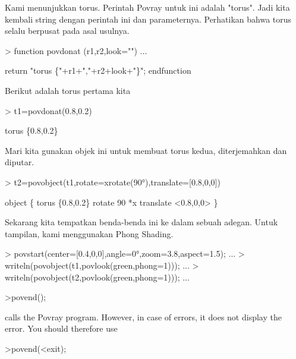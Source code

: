 \documentclass{report}
\begin{document}
\begin{eulernotebook}
\begin{eulercomment}
\begin{eulercomment}
\begin{eulercomment}
Kami menunjukkan torus. Perintah Povray untuk ini adalah "torus". Jadi
kita kembali string dengan perintah ini dan parameternya. Perhatikan
bahwa torus selalu berpusat pada asal usulnya.
\end{eulercomment}
\begin{eulerprompt}
> function povdonat (r1,r2,look="") ...
\end{eulerprompt}
\begin{eulerudf}
    return "torus \{"+r1+","+r2+look+"\}";
  endfunction
\end{eulerudf}
\begin{eulercomment}
Berikut adalah torus pertama kita
\end{eulercomment}
\begin{eulerprompt}
> t1=povdonat(0.8,0.2)
\end{eulerprompt}
\begin{euleroutput}
  torus \{0.8,0.2\}
\end{euleroutput}
\begin{eulercomment}
Mari kita gunakan objek ini untuk membuat torus kedua, diterjemahkan
dan diputar.
\end{eulercomment}
\begin{eulerprompt}
> t2=povobject(t1,rotate=xrotate(90°),translate=[0.8,0,0])
\end{eulerprompt}
\begin{euleroutput}
  object \{ torus \{0.8,0.2\}
   rotate 90 *x 
   translate <0.8,0,0>
   \}
\end{euleroutput}
\begin{eulercomment}
Sekarang kita tempatkan benda-benda ini ke dalam sebuah adegan. Untuk
tampilan, kami menggunakan Phong Shading.
\end{eulercomment}
\begin{eulerprompt}
> povstart(center=[0.4,0,0],angle=0°,zoom=3.8,aspect=1.5); ...
> writeln(povobject(t1,povlook(green,phong=1))); ...
> writeln(povobject(t2,povlook(green,phong=1))); ...
\end{eulerprompt}
\begin{eulerttcomment}
 >povend();
\end{eulerttcomment}
\begin{eulercomment}
calls the Povray program. However, in case of errors, it does not
display the error. You should therefore use

\end{eulercomment}
\begin{eulerttcomment}
 >povend(<exit);
\end{eulerttcomment}
\begin{eulercomment}


\end{eulercomment}
\end{eulercomment}
\end{eulercomment}
\end{eulernotebook}
\end{document}
